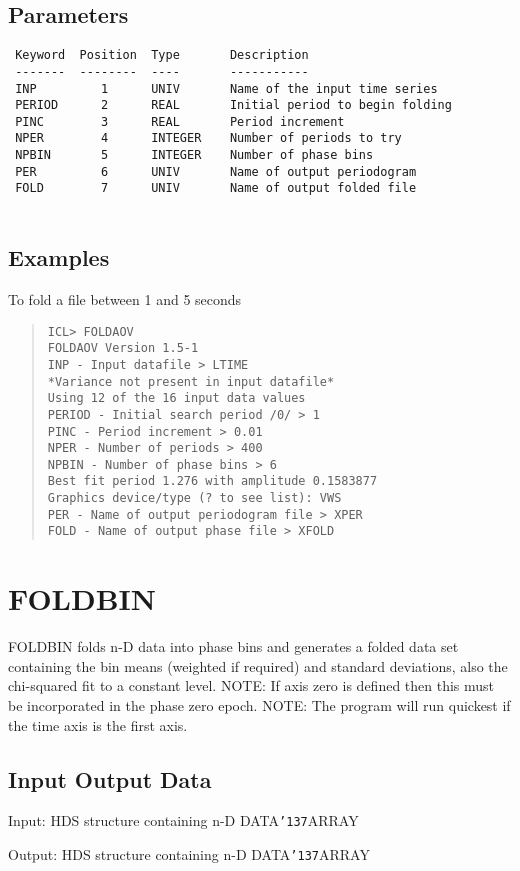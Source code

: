 \documentclass{book}
\renewcommand{\_}{{\tt\char'137}}     %
\begin{document}
\subsection{Parameters}
\begin{verbatim}
 Keyword  Position  Type       Description
 -------  --------  ----       -----------
 INP         1      UNIV       Name of the input time series
 PERIOD      2      REAL       Initial period to begin folding
 PINC        3      REAL       Period increment
 NPER        4      INTEGER    Number of periods to try
 NPBIN       5      INTEGER    Number of phase bins
 PER         6      UNIV       Name of output periodogram
 FOLD        7      UNIV       Name of output folded file
 
\end{verbatim}\subsection{Examples}
To fold a file between 1 and 5 seconds
\begin{quote}\begin{verbatim}
ICL> FOLDAOV
FOLDAOV Version 1.5-1
INP - Input datafile > LTIME
*Variance not present in input datafile*
Using 12 of the 16 input data values
PERIOD - Initial search period /0/ > 1
PINC - Period increment > 0.01
NPER - Number of periods > 400
NPBIN - Number of phase bins > 6
Best fit period 1.276 with amplitude 0.1583877
Graphics device/type (? to see list): VWS
PER - Name of output periodogram file > XPER
FOLD - Name of output phase file > XFOLD
\end{verbatim}\end{quote}
\section{FOLDBIN}
FOLDBIN folds n-D data into phase bins and generates a folded data
set containing the bin means (weighted if required) and standard
deviations, also the chi-squared fit to a constant level.
NOTE: If axis zero is defined then this must be
incorporated in the phase zero epoch.
NOTE: The program will run quickest if the
time axis is the first axis.
\subsection{Input Output Data}
Input: HDS structure containing n-D DATA\_ARRAY
 
Output: HDS structure containing n-D DATA\_ARRAY
 
\end{document}
